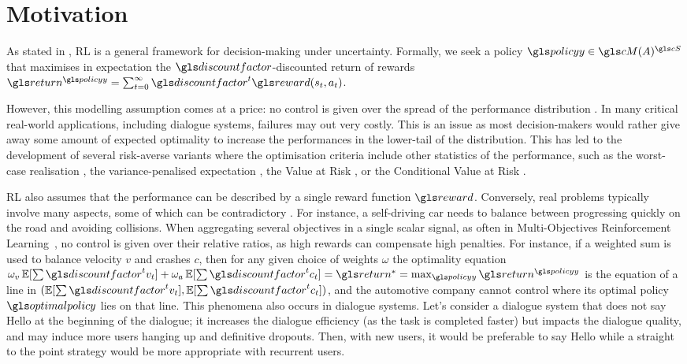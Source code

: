 \section{Motivation}
\label{sec:intro}

As stated in , \gls{RL} is a general framework for decision-making under uncertainty. Formally, we seek a policy $\policy\in\cM(A)^{\cS}$ that maximises in expectation the $\discountfactor$-discounted return of rewards $\return^{\policy} = \sum_{t=0}^\infty \discountfactor^t \reward(s_t, a_t)$.

However, this modelling assumption comes at a price: no control is given over the spread of the performance distribution \parencite{Dann2018}. In many critical real-world applications, including dialogue systems, failures may  out very costly. This is an issue as most decision-makers would rather give away some amount of expected optimality to increase the performances in the lower-tail of the distribution. This has led to the development of several risk-averse variants where the optimisation criteria include other statistics of the performance, such as the worst-case realisation \parencite{Iyengar2005,Nilim2005,Wiesemann2013}, the variance-penalised expectation \parencite{Tamar2012,Garcia2015}, the Value at Risk \parencite{Mausser2003,Luenberger2013}, or the Conditional Value at Risk \parencite{Chow2014,ChowGJP15}.

\acrlong{RL} also assumes that the performance can be described by a single reward function $\reward$. Conversely, real problems typically involve many aspects, some of which can be contradictory \parencite{Liu2014}. For instance, a self-driving car needs to balance between progressing quickly on the road and avoiding collisions. When aggregating several objectives in a single scalar signal, as often in Multi-Objectives Reinforcement Learning~\parencite{Roijers2013ASO}, no control is given over their relative ratios, as high rewards can compensate high penalties. For instance, if a weighted sum is used to balance velocity $v$ and crashes $c$, then for any given choice of weights $\omega$ the optimality equation $\omega_v\expectedvalue[\sum\discountfactor^t v_t] + \omega_a\expectedvalue[\sum\discountfactor^t c_t] = \return^* = \max_{\policy} \return^{\policy}$ is the equation of a line in $(\expectedvalue[\sum\discountfactor^t v_t], \expectedvalue[\sum\discountfactor^t c_t])$, and the automotive company cannot control where its optimal policy $\optimalpolicy$ lies on that line. This phenomena also occurs in dialogue systems. Let's consider a dialogue system that does not say Hello at the beginning of the dialogue; it increases the dialogue efficiency (as the task is completed faster) but impacts the dialogue quality, and may induce more users hanging up and definitive dropouts. Then, with new users, it would be preferable to say Hello while a straight to the point strategy would be more appropriate with recurrent users.

